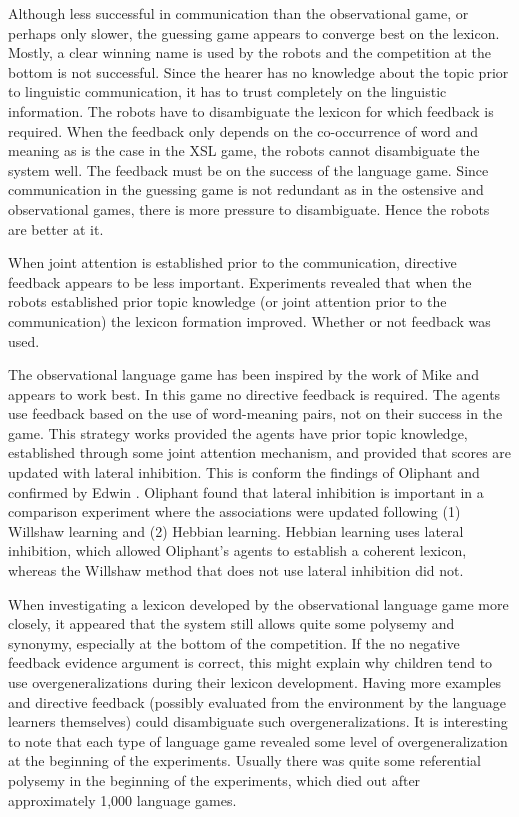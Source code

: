 Although less successful in communication than the observational game, or perhaps only slower, the guessing game appears to converge best on the lexicon. Mostly, a clear winning name is used by the robots and the competition at the bottom is not successful. Since the hearer has no knowledge about the topic prior to linguistic communication, it has to trust completely on the linguistic information. The robots have to disambiguate the lexicon for which feedback is required. When the feedback only depends on the co-occurrence of word and meaning as is the case in the XSL game, the robots cannot disambiguate the system well. The feedback must be on the success of the language game. Since communication in the guessing game is not redundant as in the ostensive and observational games, there is more pressure to disambiguate. Hence the robots are better at it.



When joint attention is established prior to the communication, directive feedback appears to be less important. Experiments revealed that when the robots established prior topic knowledge (or joint attention prior to the communication) the lexicon formation improved. Whether or not feedback was used. 

The observational language game has been inspired by the work of Mike \citet{oliphant:1997} and appears to work best. In this game no directive feedback is required.  The agents use feedback based on the use of word-meaning pairs, not on their success in the game. This strategy works provided the agents have prior topic knowledge, established through some joint attention mechanism, and provided that scores are updated with lateral inhibition. This is conform the findings of Oliphant \citep{oliphant:1997,oliphant:1998} and confirmed by Edwin \citet{dejong:2000}. Oliphant found that lateral inhibition is important in a comparison experiment where the associations were updated following (1) Willshaw learning and (2) Hebbian learning. Hebbian learning uses lateral inhibition, which allowed Oliphant's agents to establish a coherent lexicon, whereas the Willshaw method  that does not use lateral inhibition did not.

When investigating a lexicon developed by the observational language game more closely, it appeared that the system still allows quite some polysemy and synonymy, especially at the bottom of the competition. If the no negative feedback evidence argument is correct, this might explain why children tend to use overgeneralizations during their lexicon development. Having more examples and directive feedback (possibly evaluated from the environment by the language learners themselves) could disambiguate such overgeneralizations. It is interesting to note that each type of language game revealed some level of overgeneralization at the beginning of the experiments. Usually there was quite some referential polysemy in the beginning of the experiments, which died out after approximately 1,000 language games. 

